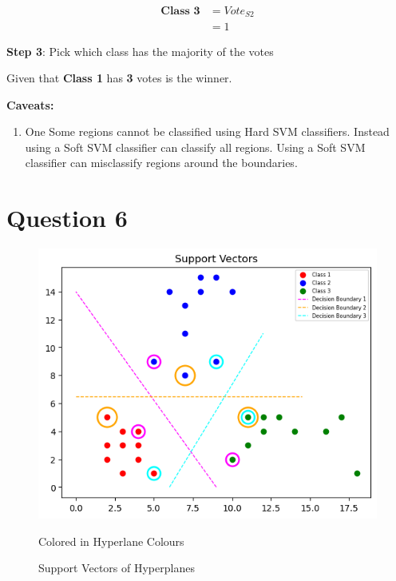 \documentclass[12pt]{report}
\begin{document}
\begin{equation*}
	\begin{aligned}
		\textbf{Class 3} & =  Vote_{S2} \\
		                 & = 1
	\end{aligned}
\end{equation*}\newline


\textbf{Step 3}: Pick which class has the majority of the votes

\vspace{10pt}

Given that \textbf{Class 1} has \textbf{3} votes is the winner.

\vspace{10pt}

\textbf{Caveats:}\newline


\begin{enumerate}
	\item One
	      Some regions cannot be classified using Hard SVM classifiers. Instead using a Soft SVM classifier can classify all regions. Using a Soft SVM classifier can misclassify regions around the boundaries.
\end{enumerate}

\section{Question 6}

\begin{figure}[H]
	\centering
	\includegraphics[width=\textwidth]{supportvectors.png}
	\caption{Support Vectors of Hyperplanes}
	Colored in Hyperlane Colours
\end{figure}
\end{document}
